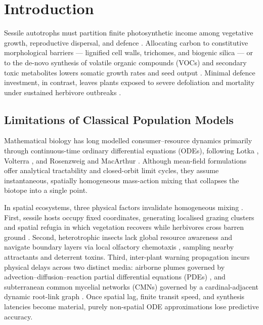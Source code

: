 
\section{Introduction}
\label{sec:introduction}

Sessile autotrophs must partition finite photosynthetic income among vegetative growth, reproductive dispersal, and defence \cite{gatehouse2002plant, farmer2001surface, baldwin2006volatile}. Allocating carbon to constitutive morphological barriers --- lignified cell walls, trichomes, and biogenic silica --- or to the de-novo synthesis of volatile organic compounds (VOCs) and secondary toxic metabolites lowers somatic growth rates and seed output \cite{gatehouse2002plant, babikova2013underground, arimura2025cracking}. Minimal defence investment, in contrast, leaves plants exposed to severe defoliation and mortality under sustained herbivore outbreaks \cite{holling1959components, charnov1976optimal, rosenzweig1963graphical}.

\subsection{Limitations of Classical Population Models}
\label{sec:intro_fallacy_mixing}

Mathematical biology has long modelled consumer--resource dynamics primarily through continuous-time ordinary differential equations (ODEs), following Lotka \cite{lotka1925elements}, Volterra \cite{volterra1926fluctuations}, and Rosenzweig and MacArthur \cite{rosenzweig1963graphical}. Although mean-field formulations offer analytical tractability and closed-orbit limit cycles, they assume instantaneous, spatially homogeneous mass-action mixing that collapses the biotope into a single point.

In spatial ecosystems, three physical factors invalidate homogeneous mixing \cite{skellam1951random, turing1952chemical, okubo2001diffusion}. First, sessile hosts occupy fixed coordinates, generating localised grazing clusters and spatial refugia in which vegetation recovers while herbivores cross barren ground \cite{charnov1976optimal}. Second, heterotrophic insects lack global resource awareness and navigate boundary layers via local olfactory chemotaxis \cite{keller1970initiation, okubo2001diffusion}, sampling nearby attractants and deterrent toxins. Third, inter-plant warning propagation incurs physical delays across two distinct media: airborne plumes governed by advection--diffusion--reaction partial differential equations (PDEs) \cite{farmer2001surface, aratani2023green, arimura2025cracking}, and subterranean common mycelial networks (CMNs) governed by a cardinal-adjacent dynamic root-link graph \cite{babikova2013underground, karst2023positive, henriksson2023reexamining}. Once spatial lag, finite transit speed, and synthesis latencies become material, purely non-spatial ODE approximations lose predictive accuracy.

